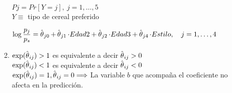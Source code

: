 \begin{enumerate}[label=\color{red}\textbf{\arabic*)}, leftmargin=*]
\begin{enumerate}[label=\color{red}\alph*)]
		$Pj=Pr[Y=j],\: j=1,\dots,5$\\
		$Y\equiv$ tipo de cereal preferido
		
		$\log\dfrac{p_j}{p_s}=\operatorname{\hat{\theta}}_{j0}+\operatorname{\hat{\theta}}_{j1}\cdot Edad2+\operatorname{\hat{\theta}}_{j2}\cdot Edad3+\operatorname{\hat{\theta}}_{j4}\cdot Estilo,\quad j=1,\dots,4$
		\item {}
		
		$\exp(\operatorname{\hat{\theta}}_{ij})>1$ es equivalente a decir $\operatorname{\hat{\theta}}_{ij}>0$\\
		$\exp(\operatorname{\hat{\theta}}_{ij})<1$ es equivalente a decir $\operatorname{\hat{\theta}}_{ij}<0$\\
		$\exp(\operatorname{\hat{\theta}}_{ij})=1,\operatorname{\hat{\theta}}_{ij}=0\Longrightarrow$ La variable $b$ que acompaña el coeficiente no afecta en la predicción.
	\end{enumerate}
\end{enumerate}